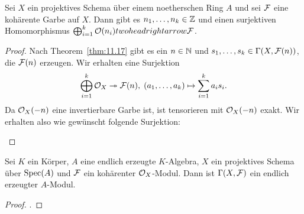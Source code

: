 \begin{kor}
\label{kor:11.18}
	Sei $X$ ein projektives Schema über einem noetherschen Ring $A$ und sei $\mathcal{F}$ eine kohärente Garbe auf $X$. Dann gibt es $n_1,\ldots,n_k \in \mathbb {Z}$ und einen surjektiven Homomorphismus $\bigoplus_{i=1}^k\mathcal{O}(n_i)\\twoheadrightarrow \mathcal{F}$.
	\begin{proof}
		Nach Theorem~\ref{thm:11.17} gibt es ein $n \in \mathbb {N}$ und $s_1,\ldots,s_k\in \Gamma(X,\mathcal{F}(n))$, die $\mathcal{F}(n)$ erzeugen. Wir erhalten eine Surjektion
		\[
			\bigoplus_{i=1}^k\mathcal{O}_X \twoheadrightarrow \mathcal{F}(n), \; (a_1,\ldots,a_k)\mapsto \sum_{i=1}^ka_is_i.
		\]
		Da $\mathcal{O}_X(-n)$ eine invertierbare Garbe ist, ist tensorieren mit $\mathcal{O}_X(-n)$ exakt. Wir erhalten also wie gewünscht folgende Surjektion:
		\begin{center}
		\end{center}
	\end{proof}
\end{kor}

\begin{thm}
\label{thm:11.19}
	Sei $K$ ein Körper, $A$ eine endlich erzeugte $K$-Algebra, $X$ ein projektives Schema über $\operatorname{Spec}(A)$ und $\mathcal{F}$ ein kohärenter $\mathcal{O}_X$-Modul. Dann ist $\Gamma(X,\mathcal{F})$ ein endlich erzeugter $A$-Modul.
	\begin{proof}
		\cite[Theorem~II.5.19]{hartshorne1977algebraic}.
	\end{proof}
\end{thm}

